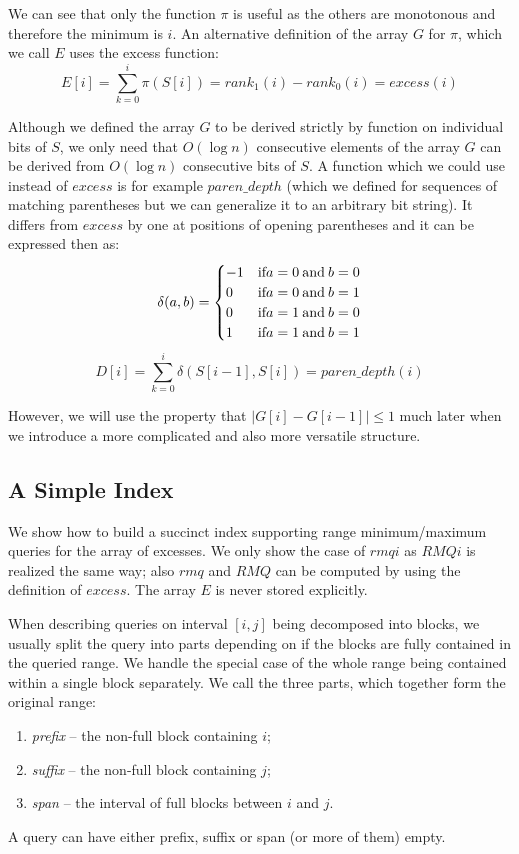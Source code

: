 We can see that only the function $\pi$ is useful as the others are monotonous and therefore the minimum is $i$.
An alternative definition of the array $G$ for $\pi$, which we call $E$ uses the excess function:
$$ E[i] = \sum_{k=0}^i \pi(S[i]) = rank_1(i) - rank_0(i) = excess(i) $$

Although we defined the array $G$ to be derived strictly by function on individual bits of $S$, we only need that $O(\log n)$ consecutive elements of the array $G$ can be derived from $O(\log n)$ consecutive bits of $S$.
A function which we could use instead of $excess$ is for example $paren\_depth$ (which we defined for sequences of matching parentheses but we can generalize it to an arbitrary bit string).
It differs from $excess$ by one at positions of opening parentheses and it can be expressed then as:
$$\delta(a, b) = 
\begin{cases}
-1 &\textrm{if} a = 0 \mathbin{\textrm{and}} b = 0 \\
0 &\textrm{if} a = 0 \mathbin{\textrm{and}} b = 1 \\
0 &\textrm{if} a = 1 \mathbin{\textrm{and}} b = 0 \\
1 &\textrm{if} a = 1 \mathbin{\textrm{and}} b = 1
\end{cases}$$
$$D[i] = \sum_{k=0}^i \delta(S[i - 1], S[i]) = paren\_depth(i)$$

However, we will use the property that $| G[i] - G[i-1] | \le 1$ much later when we introduce a more complicated and also more versatile structure.

\subsection{A Simple Index}

We show how to build a succinct index supporting range minimum/maximum queries for the array of excesses.
We only show the case of $rmqi$ as $RMQi$ is realized the same way; also $rmq$ and $RMQ$ can be computed by using the definition of $excess$.
The array $E$ is never stored explicitly.

When describing queries on interval $[i, j]$ being decomposed into blocks, we usually split the query into parts depending on if the blocks are fully contained in the queried range.
We handle the special case of the whole range being contained within a single block separately.
We call the three parts, which together form the original range:
\begin{enumerate}
	\item \emph{prefix} -- the non-full block containing $i$;
	\item \emph{suffix} -- the non-full block containing $j$;
	\item \emph{span} -- the interval of full blocks between $i$ and $j$.
\end{enumerate}
A query can have either prefix, suffix or span (or more of them) empty.

